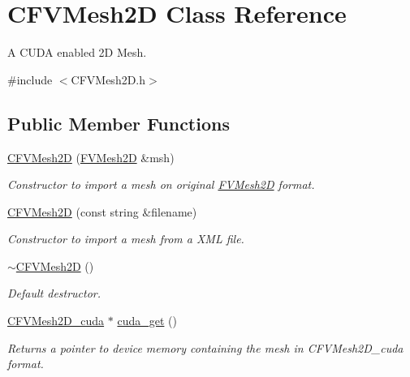 \hypertarget{classFVL_1_1CFVMesh2D}{
\section{CFVMesh2D Class Reference}
\label{da/d8d/classFVL_1_1CFVMesh2D}
}


A CUDA enabled 2D Mesh.  




{\ttfamily \#include $<$CFVMesh2D.h$>$}

\subsection*{Public Member Functions}
\begin{DoxyCompactItemize}
\item 
\hyperlink{classFVL_1_1CFVMesh2D_aa7a00d0164463a128c305eff51e3218d}{CFVMesh2D} (\hyperlink{classFVMesh2D}{FVMesh2D} \&msh)
\begin{DoxyCompactList}\small\item\em Constructor to import a mesh on original \hyperlink{classFVMesh2D}{FVMesh2D} format. \item\end{DoxyCompactList}\item 
\hyperlink{classFVL_1_1CFVMesh2D_a1cac005d50e5d1ed3d3a279bded6560c}{CFVMesh2D} (const string \&filename)
\begin{DoxyCompactList}\small\item\em Constructor to import a mesh from a XML file. \item\end{DoxyCompactList}\item 
\hyperlink{classFVL_1_1CFVMesh2D_a1e8707cd63592ebc0debed957fb072e9}{$\sim$CFVMesh2D} ()
\begin{DoxyCompactList}\small\item\em Default destructor. \item\end{DoxyCompactList}\item 
\hyperlink{structFVL_1_1CFVMesh2D__cuda}{CFVMesh2D\_\-cuda} $\ast$ \hyperlink{classFVL_1_1CFVMesh2D_af4e692bafdba2014d215f7a7ba2bdc3a}{cuda\_\-get} ()
\begin{DoxyCompactList}\small\item\em Returns a pointer to device memory containing the mesh in CFVMesh2D\_\-cuda format. \item\end{DoxyCompactList}\item 

\end{DoxyCompactItemize}
